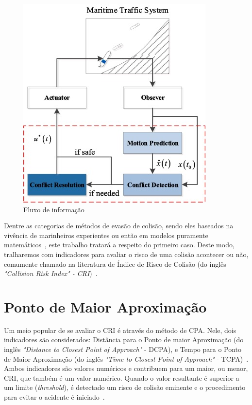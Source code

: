         \begin{figure}[H]
            \centering
            \includegraphics{fig/chap2/information_flow.png}
            \caption{Fluxo de informação ~\cite{HUANG2020451}}
            \label{fig:Huang2020_collisionAvoidanceProcess}
        \end{figure}
        
        Dentre as categorias de métodos de evasão de colisão, sendo eles baseados na vivência de marinheiros experientes ou então em modelos puramente matemáticos~\cite{HUANG2020451}, este trabalho tratará a respeito do primeiro caso. Deste modo, tralharemos com indicadores para avaliar o risco de uma colisão acontecer ou não, comumente chamado na literatura de Índice de Risco de Colisão (do inglês \textit{"Collision Risk Index" - CRI})~\cite{HUANG2019142}.
        
    \section{Ponto de Maior Aproximação}\label{subchap2:cpa}
        Um meio popular de se avaliar o CRI é através do método de CPA. Nele, dois indicadores são considerados: Distância para o Ponto de maior Aproximação (do inglês \textit{"Distance to Closest Point of Approach"} - DCPA), e Tempo para o Ponto de Maior Aproximação (do inglês \textit{"Time to Closest Point of Approach"} - TCPA)~\cite{HUANG2019142}. Ambos indicadores são valores numéricos e contribuem para um maior, ou menor, CRI, que também é um valor numérico. Quando o valor resultante é superior a um limite (\textit{threshold}), é detectado um risco de colisão eminente e o procedimento para evitar o acidente é iniciado~\cite{HUANG2020451}. 
        
